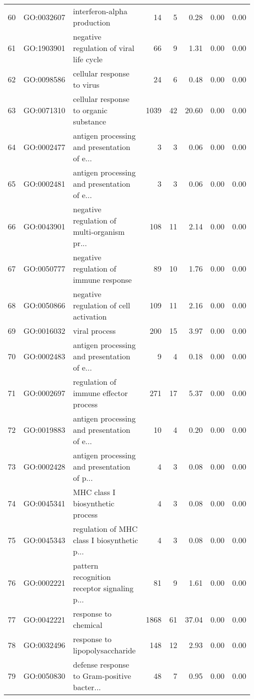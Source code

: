 \begin{table}[ht]
\begin{tabular}{rllrrrrr}
  60 & GO:0032607 & interferon-alpha production &  14 &   5 & 0.28 & 0.00 & 0.00 \\ 
  61 & GO:1903901 & negative regulation of viral life cycle &  66 &   9 & 1.31 & 0.00 & 0.00 \\ 
  62 & GO:0098586 & cellular response to virus &  24 &   6 & 0.48 & 0.00 & 0.00 \\ 
  63 & GO:0071310 & cellular response to organic substance & 1039 &  42 & 20.60 & 0.00 & 0.00 \\ 
  64 & GO:0002477 & antigen processing and presentation of e... &   3 &   3 & 0.06 & 0.00 & 0.00 \\ 
  65 & GO:0002481 & antigen processing and presentation of e... &   3 &   3 & 0.06 & 0.00 & 0.00 \\ 
  66 & GO:0043901 & negative regulation of multi-organism pr... & 108 &  11 & 2.14 & 0.00 & 0.00 \\ 
  67 & GO:0050777 & negative regulation of immune response &  89 &  10 & 1.76 & 0.00 & 0.00 \\ 
  68 & GO:0050866 & negative regulation of cell activation & 109 &  11 & 2.16 & 0.00 & 0.00 \\ 
  69 & GO:0016032 & viral process & 200 &  15 & 3.97 & 0.00 & 0.00 \\ 
  70 & GO:0002483 & antigen processing and presentation of e... &   9 &   4 & 0.18 & 0.00 & 0.00 \\ 
  71 & GO:0002697 & regulation of immune effector process & 271 &  17 & 5.37 & 0.00 & 0.00 \\ 
  72 & GO:0019883 & antigen processing and presentation of e... &  10 &   4 & 0.20 & 0.00 & 0.00 \\ 
  73 & GO:0002428 & antigen processing and presentation of p... &   4 &   3 & 0.08 & 0.00 & 0.00 \\ 
  74 & GO:0045341 & MHC class I biosynthetic process &   4 &   3 & 0.08 & 0.00 & 0.00 \\ 
  75 & GO:0045343 & regulation of MHC class I biosynthetic p... &   4 &   3 & 0.08 & 0.00 & 0.00 \\ 
  76 & GO:0002221 & pattern recognition receptor signaling p... &  81 &   9 & 1.61 & 0.00 & 0.00 \\ 
  77 & GO:0042221 & response to chemical & 1868 &  61 & 37.04 & 0.00 & 0.00 \\ 
  78 & GO:0032496 & response to lipopolysaccharide & 148 &  12 & 2.93 & 0.00 & 0.00 \\ 
  79 & GO:0050830 & defense response to Gram-positive bacter... &  48 &   7 & 0.95 & 0.00 & 0.00 \\ 

\end{tabular}
\end{table}
